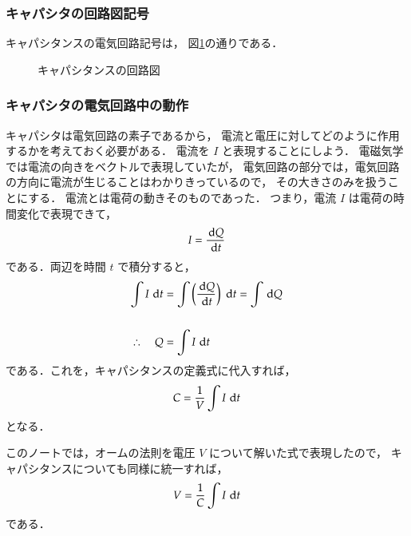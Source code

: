    \subsubsection{キャパシタの回路図記号}\label{subsub:kairozu_capacita}
        キャパシタンスの電気回路記号は，
        図\ref{fig:kairozu_capacita}の通りである．
                    \begin{figure}[hbt]
                        \begin{center}
                            \caption{キャパシタンスの回路図}
                            \label{fig:kairozu_capacita}
                        \end{center}
                    \end{figure}

    \subsubsection{キャパシタの電気回路中の動作}
        キャパシタは電気回路の素子であるから，
        電流と電圧に対してどのように作用するかを考えておく必要がある．
        電流を $I$ と表現することにしよう．
        電磁気学では電流の向きをベクトルで表現していたが，
        電気回路の部分では，電気回路の方向に電流が生じることはわかりきっているので，
        その大きさのみを扱うことにする．
        電流とは電荷の動きそのものであった．
        つまり，電流  $I$ は電荷の時間変化で表現できて，
            \begin{align}
                I=\frac{\,\mathrm{d} Q}{\,\mathrm{d} t}
            \end{align}
        である．両辺を時間 $t$ で積分すると，
            \begin{align}
                \int I\,\,\mathrm{d} t&=\int \left(\frac{\,\mathrm{d} Q}{\,\mathrm{d} t}\right) \,\,\mathrm{d} t
                =\int \,\mathrm{d} Q  \\ \notag \\ \notag
                \therefore\quad Q&=\int I\,\,\mathrm{d} t
            \end{align}
        である．これを，キャパシタンスの定義式に代入すれば，
            \begin{align}
                C=\frac{1}{V}\int I\,\,\mathrm{d} t
            \end{align}
        となる．

        このノートでは，オームの法則を電圧 $V$ について解いた式で表現したので，
        キャパシタンスについても同様に統一すれば，
            \begin{align}
                V=\frac{1}{C}\int I\,\,\mathrm{d} t
            \end{align}
        である．

